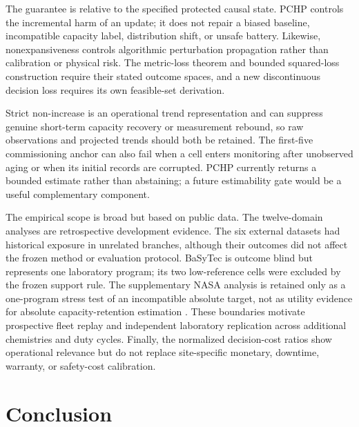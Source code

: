 \documentclass[preprint,12pt]{elsarticle}
\begin{document}
The guarantee is relative to the specified protected causal state. PCHP controls the incremental harm of an update; it does not repair a biased baseline, incompatible capacity label, distribution shift, or unsafe battery. Likewise, nonexpansiveness controls algorithmic perturbation propagation rather than calibration or physical risk. The metric-loss theorem and bounded squared-loss construction require their stated outcome spaces, and a new discontinuous decision loss requires its own feasible-set derivation.

Strict non-increase is an operational trend representation and can suppress genuine short-term capacity recovery or measurement rebound, so raw observations and projected trends should both be retained. The first-five commissioning anchor can also fail when a cell enters monitoring after unobserved aging or when its initial records are corrupted. PCHP currently returns a bounded estimate rather than abstaining; a future estimability gate would be a useful complementary component.

The empirical scope is broad but based on public data. The twelve-domain analyses are retrospective development evidence. The six external datasets had historical exposure in unrelated branches, although their outcomes did not affect the frozen method or evaluation protocol. BaSyTec is outcome blind but represents one laboratory program; its two low-reference cells were excluded by the frozen support rule. The supplementary NASA analysis is retained only as a one-program stress test of an incompatible absolute target, not as utility evidence for absolute capacity-retention estimation \citep{saha2007nasa}. These boundaries motivate prospective fleet replay and independent laboratory replication across additional chemistries and duty cycles. Finally, the normalized decision-cost ratios show operational relevance but do not replace site-specific monetary, downtime, warranty, or safety-cost calibration.

\section{Conclusion}
\end{document}
